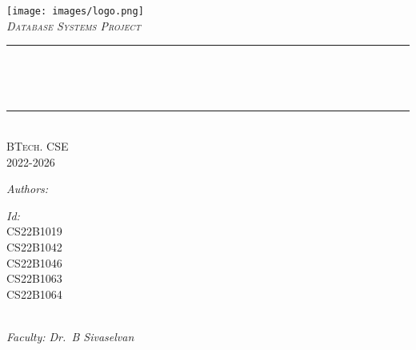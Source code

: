 
\begin{titlepage}

    \vspace*{-3cm}
    \newcommand{\HRule}{\rule{\linewidth}{0.5mm}} %
    
    
    \center
    \texttt{[image: images/logo.png]}\\[1cm]
    
    
    \textsc{\large \emph{Database Systems Project}}\\[1cm]
    
    \makeatletter
    \rule{\linewidth}{0.2 mm} \\[0.4 cm]
    {\huge\bfseries \@title\par} \
    \rule{\linewidth}{0.2 mm} \\[1.0 cm]
    \textsc{\fontsize{14}{14}\selectfont BTech. CSE\\2022-2026}\\[1.5cm] %
    
    \begin{minipage}{0.4\textwidth}
    \begin{flushleft} 
    \emph{\fontsize{22}{22}\selectfont Authors:}\\
    \@author
    \end{flushleft}
    \end{minipage}
    \begin{minipage}{0.4\textwidth}
    \begin{flushright} 
    
    
    \emph{\fontsize{22}{22}\selectfont Id:}
    \fontsize{15}{15}\selectfont\\CS22B1019\\ CS22B1042\\ CS22B1046\\ CS22B1063\\ CS22B1064\\
    \end{flushright}
    \end{minipage}\\
    \vspace{1cm}
    \emph{\fontsize{15}{15}\selectfont Faculty: Dr.\ B Sivaselvan}\\
    \vspace{1cm}
    \makeatother
    
    
    
    
    
    
    \end{titlepage}
    
    
    